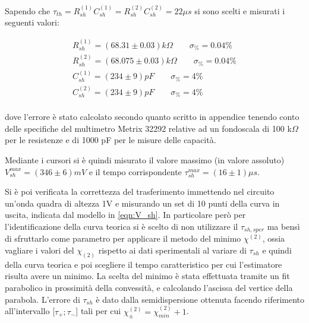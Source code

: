 \documentclass{article}
\begin{document}
Sapendo che $\tau_{th}=R_{sh}^{(1)} C_{sh}^{(1)} = R_{sh}^{(2)} C_{sh}^{(2)}=22 \mu s$ si sono scelti e misurati i seguenti valori:

\begin{align*}
R_{sh}^{(1)} = (68.31  \pm 0.03)k\Omega \quad\quad \sigma_{\%}=  0.04 \% \\
R_{sh}^{(2)} = (68.075  \pm 0.03)k\Omega \quad\quad \sigma_{\%}=  0.04\% \\
C_{sh}^{(1)}= (234 \pm  9)pF \quad\quad \sigma_{\%}= 4 \% \\
C_{sh}^{(2)}= (234 \pm  9)pF \quad\quad \sigma_{\%}= 4 \% \\
\end{align*}

dove l'errore è stato calcolato secondo quanto scritto in appendice tenendo conto delle specifiche del multimetro Metrix 32292 relative
ad un fondoscala di 100 k$\Omega$ per le resistenze e di 1000 pF per le misure delle capacità.

Mediante i cursori si è quindi misurato il valore massimo (in valore assoluto) $V_{sh}^{max}=(346 \pm 6)mV$ e il tempo corrispondente 
$\tau_{sh}^{max}=(16 \pm 1)\mu s$.

Si è poi verificata la correttezza del trasferimento immettendo nel circuito un'onda quadra di altezza 1V e misurando un set di 10 punti 
della curva in uscita, indicata dal modello in \ref{eqn:V_sh}. In particolare però per l'identificazione della curva teorica si è 
scelto di non utilizzare il $\tau_{sh,sper}$ ma bensì di sfruttarlo come parametro per applicare il metodo del minimo $\chi^{(2)}$, 
ossia vagliare i valori del $\chi_{(2)}$ rispetto ai dati sperimentali al variare di $\tau_{sh}$ e quindi
della curva teorica e poi scegliere il tempo caratteristico per cui l'estimatore risulta avere un minimo. 
La scelta del minimo è stata effettuata tramite un fit parabolico in prossimità della convessità, e calcolando l'ascissa del 
vertice della parabola.
L'errore di $\tau_{sh}$ è dato dalla semidispersione ottenuta facendo riferimento all'intervallo [$\tau_+ ; \tau_-$] 
tali per cui $\chi^{(2)}_{\pm} = \chi^{(2)}_{min} + 1$.
\end{document}
